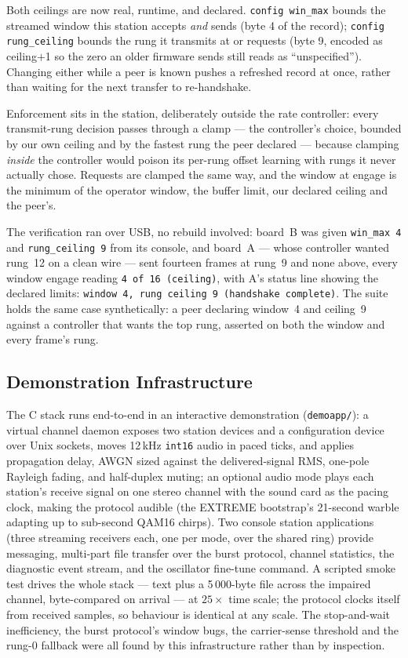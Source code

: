 Both ceilings are now real, runtime, and declared. \texttt{config
win\_max} bounds the streamed window this station accepts \emph{and}
sends (byte 4 of the record); \texttt{config rung\_ceiling} bounds
the rung it transmits at or requests (byte 9, encoded as
ceiling$+$1 so the zero an older firmware sends still reads as
``unspecified''). Changing either while a peer is known pushes a
refreshed record at once, rather than waiting for the next transfer to
re-handshake.

Enforcement sits in the station, deliberately outside the rate
controller: every transmit-rung decision passes through a clamp ---
the controller's choice, bounded by our own ceiling and by the fastest
rung the peer declared --- because clamping \emph{inside} the
controller would poison its per-rung offset learning with rungs it
never actually chose. Requests are clamped the same way, and the
window at engage is the minimum of the operator window, the buffer
limit, our declared ceiling and the peer's.

The verification ran over USB, no rebuild involved: board~B was given
\texttt{win\_max 4} and \texttt{rung\_ceiling 9} from its console,
and board~A --- whose controller wanted rung~12 on a clean wire ---
sent fourteen frames at rung~9 and none above, every window engage
reading \texttt{4 of 16 (ceiling)}, with A's status line showing the
declared limits: \texttt{window 4, rung ceiling 9 (handshake
complete)}. The suite holds the same case synthetically: a peer
declaring window~4 and ceiling~9 against a controller that wants the
top rung, asserted on both the window and every frame's rung.

\subsection{Demonstration Infrastructure}
\label{sec:cport_demo}

The C stack runs end-to-end in an interactive demonstration
(\texttt{demoapp/}): a virtual channel daemon exposes two station
devices and a configuration device over Unix sockets, moves 12\,kHz
\texttt{int16} audio in paced ticks, and applies propagation delay,
AWGN sized against the delivered-signal RMS, one-pole Rayleigh fading,
and half-duplex muting; an optional audio mode plays each station's
receive signal on one stereo channel with the sound card as the pacing
clock, making the protocol audible (the EXTREME bootstrap's 21-second
warble adapting up to sub-second QAM16 chirps).  Two console station
applications (three streaming receivers each, one per mode, over the
shared ring) provide messaging, multi-part file transfer over the
burst protocol, channel statistics, the diagnostic event stream, and
the oscillator fine-tune command.  A scripted smoke test drives the
whole stack --- text plus a 5\,000-byte file across the impaired
channel, byte-compared on arrival --- at $25\times$ time scale; the
protocol clocks itself from received samples, so behaviour is
identical at any scale.  The stop-and-wait inefficiency, the burst
protocol's window bugs, the carrier-sense threshold and the rung-0
fallback were all found by this infrastructure rather than by
inspection.

